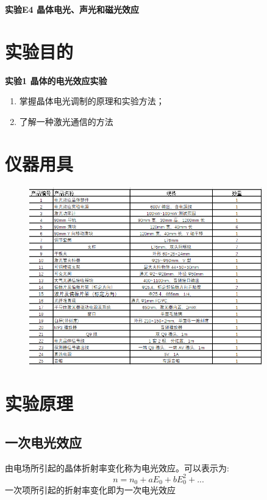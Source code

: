 \documentclass[UTF8]{ctexart}
\newcommand\tit{实验E4 晶体电光、声光和磁光效应}
\begin{document}
\newpage
\begin{center}
	\Large
	\textbf{\tit}
\end{center}
\section{实验目的}
\begin{center}
	\large \textbf{实验1 晶体的电光效应实验}
\end{center}
\begin{enumerate}
	\item 掌握晶体电光调制的原理和实验方法；
	\item 了解一种激光通信的方法
\end{enumerate}

\section{仪器用具}
\begin{figure}[!h]
	\centering
	\includegraphics[width=0.9\textwidth]{tab}
\end{figure}
\section{实验原理}
\subsection{一次电光效应}
由电场所引起的晶体折射率变化称为电光效应。可以表示为:
\begin{equation}
	n=n_{0}+aE_{0}+bE_{0}^{2}+...
\end{equation}
一次项所引起的折射率变化即为一次电光效应
\end{document}

